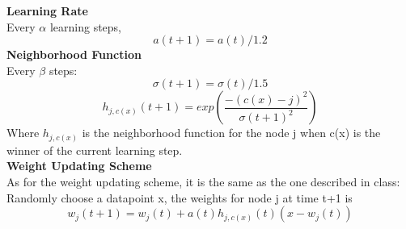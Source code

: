 \documentclass[epsfig]{article}
\begin{document}
\textbf{Learning Rate}\\
Every $\alpha$ learning steps, 
$$a(t+1) = a(t) /  1.2$$
\textbf{Neighborhood Function}\\
Every $\beta$ steps:
$$\sigma(t+1) =  \sigma(t)/  1.5$$ 
$$h_{j, c(x)} (t+1) = exp({\frac{-(c(x)-j)^2}{\sigma(t+1) ^2}})$$ 
Where $h_{j, c(x)}$ is the neighborhood function for the node j when c(x) is the winner of the current learning step.\\
\newline
\newline
\textbf{Weight Updating Scheme}\\
As for the weight updating scheme, it is the same as the one described in class:\\
Randomly choose a datapoint x, the weights for node j at time t+1 is\\
$$w_j(t+1) =  w_j(t)  + a(t) h_{j, c(x)} (t) ( x- w_j(t))$$ 
\end{document}
